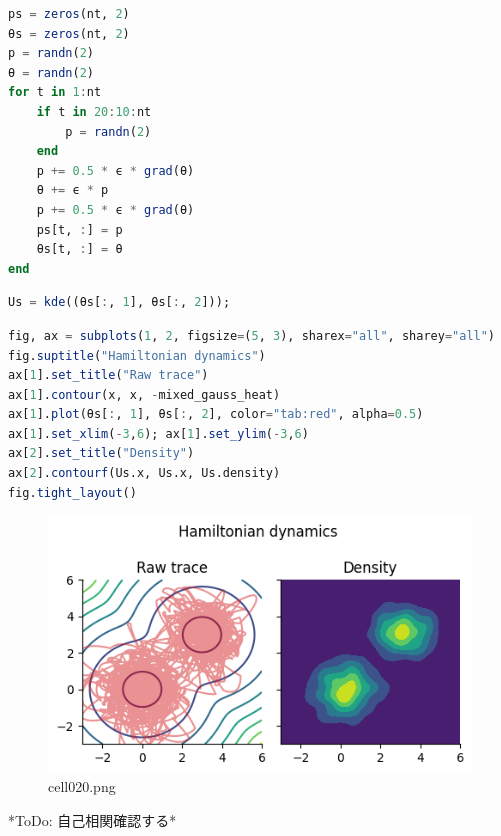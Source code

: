 \begin{lstlisting}[language=julia]
ps = zeros(nt, 2)
θs = zeros(nt, 2)
p = randn(2)
θ = randn(2)
for t in 1:nt
    if t in 20:10:nt
        p = randn(2)
    end
    p += 0.5 * ϵ * grad(θ)
    θ += ϵ * p
    p += 0.5 * ϵ * grad(θ)
    ps[t, :] = p
    θs[t, :] = θ
end
\end{lstlisting}
\begin{lstlisting}[language=julia]
Us = kde((θs[:, 1], θs[:, 2]));
\end{lstlisting}
\begin{lstlisting}[language=julia]
fig, ax = subplots(1, 2, figsize=(5, 3), sharex="all", sharey="all")
fig.suptitle("Hamiltonian dynamics")
ax[1].set_title("Raw trace")
ax[1].contour(x, x, -mixed_gauss_heat)
ax[1].plot(θs[:, 1], θs[:, 2], color="tab:red", alpha=0.5)
ax[1].set_xlim(-3,6); ax[1].set_ylim(-3,6)
ax[2].set_title("Density")
ax[2].contourf(Us.x, Us.x, Us.density)
fig.tight_layout()
\end{lstlisting}
\begin{figure}[ht]
	\centering
	\includegraphics[scale=0.8, max width=\linewidth]{./fig/bayesian-brain/mcmc/cell020.png}
	\caption{cell020.png}
	\label{cell020.png}
\end{figure}
*ToDo: 自己相関確認する*
